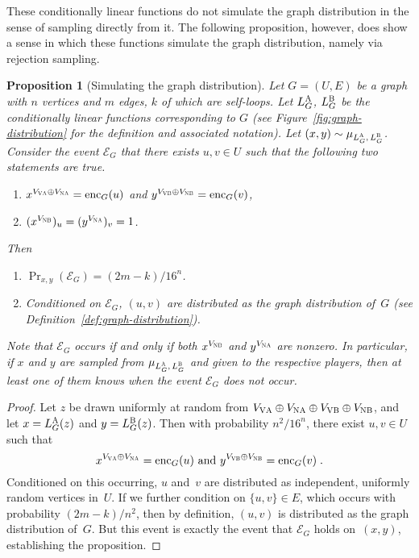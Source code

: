\documentclass[11pt]{article}
\newtheorem{proposition}[theorem]{Proposition}
\theoremstyle{definition}
\newcommand{\labelstyle}[1]{\ensuremath{\textsc{#1}}\xspace}
\newcommand{\vertex}[1]{\labelstyle{V#1}}
\newcommand{\edge}[1]{\labelstyle{N#1}}
\newcommand{\alice}{\labelstyle{A}}
\newcommand{\bob}{\labelstyle{B}}
\begin{document}
These conditionally linear functions do not simulate the graph distribution
in the sense of sampling directly from it.
The following proposition, however, does show a sense in which these functions
simulate the graph distribution, namely via rejection sampling.

\begin{proposition}[Simulating the graph distribution]
  \label{prop:simulating-graph}
  Let $G = (U, E)$ be a graph with $n$ vertices and $m$ edges, $k$ of which
  are self-loops.
  Let $L^\alice_G$, $L^\bob_G$ be the conditionally linear functions
  corresponding to $G$ (see Figure~\ref{fig:graph-distribution} for the
  definition and associated notation).
  Let $(x, y) \sim \mu_{L^\alice_G,\, L^\bob_G}$.
  Consider the event $\mathcal{E}_G$ that there exists $u, v \in U$ such that
  the following two statements are true.
  \begin{enumerate}[label=(\roman*)]
  \item $x^{V_{\vertex{\alice}} \oplus V_{\edge{\alice}}} = \mathrm{enc}_G(u)$
   	and $y^{V_{\vertex{\bob}} \oplus V_{\edge{\bob}}} = \mathrm{enc}_G(v)$,
  \item  $(x^{V_{\edge{\bob}}})_u = (y^{V_{\edge{\alice}}})_v = 1$.
  \end{enumerate}
  Then
  \begin{enumerate}
  \item \label{item:graph-prob} $\Pr_{x, y} (\mathcal{E}_G) = (2m-k)/16^n$.
  \item \label{item:edge-dist} Conditioned on $\mathcal{E}_G$, $(u, v)$ are
    distributed as the graph distribution of~$G$ (see
    Definition~\ref{def:graph-distribution}).
  \end{enumerate}
  Note that $\mathcal{E}_G$ occurs if and only if both $x^{V_\edge{\bob}}$ and
  $y^{V_\edge{\alice}}$ are nonzero.
  In particular, if $x$ and $y$ are sampled from $\mu_{L^\alice_G,\, L^\bob_G}$
  and given to the respective players, then at least one of them knows when the
  event $\mathcal{E}_G$ does \emph{not} occur.
\end{proposition}

\begin{proof}
  Let $z$ be drawn uniformly at random from $V_{\vertex{\alice}}\oplus
  V_{\edge{\alice}}\oplus V_{\vertex{\bob}} \oplus V_{\edge{\bob}}$, and let $x
  = L^\alice_G(z)$ and $y = L^\bob_G(z)$.
  Then with probability $n^2/16^n$, there exist $u, v \in U$ such that
  \begin{equation*}
    \text{$x^{V_{\vertex{\alice}} \oplus V_{\edge{\alice}}} = \mathrm{enc}_G(u)$
      and $y^{V_{\vertex{\bob}} \oplus V_{\edge{\bob}}} = \mathrm{enc}_G(v)$}\;.
  \end{equation*}
  Conditioned on this occurring, $u$ and~$v$ are distributed as independent,
  uniformly random vertices in~$U$.
  If we further condition on $\{u, v\} \in E$, which occurs with probability
  $(2m-k)/n^2$, then by definition, $(u, v)$ is distributed as the graph
  distribution of~$G$.
  But this event is exactly the event that $\mathcal{E}_G$ holds on~$(x, y)$,
  establishing the proposition.
\end{proof}
\end{document}
